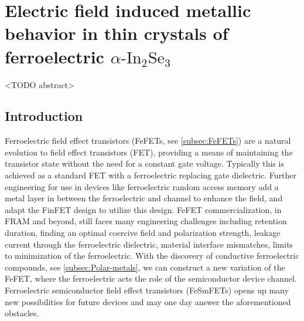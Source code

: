 
\chapter{Electric field induced metallic behavior in thin crystals of ferroelectric
$\ensuremath{\alpha}\textrm{-In}_{2}\textrm{Se}_{3}$\label{chapter:FeSm-FET}}

<TODO abstract>

\section{Introduction}

Ferroelectric field effect transistors (FeFETs, see \ref{subsec:FeFETs})
are a natural evolution to field effect transistors (FET), providing
a means of maintaining the transistor state without the need for a
constant gate voltage. Typically this is achieved as a standard FET
with a ferroelectric replacing gate dielectric.\citep{si2018ferroelectric,dunkel2017fefet}
Further engineering for use in devices like ferroelectric random access
memory add a metal layer in between the ferroelectric and channel
to enhance the field, and adapt the FinFET design to utilize this
design.\citep{khan2020future} FeFET commercialization, in FRAM and
beyond, still faces many engineering challenges including retention
duration, finding an optimal coercive field and polarization strength,
leakage current through the ferroelectric dielectric, material interface
mismatches, limits to minimization of the ferroelectric.\citep{ma2002why,khan2020future}
With the discovery of conductive ferroelectric compounds, see \ref{subsec:Polar-metals},
we can construct a new variation of the FeFET, where the ferroelectric
acts the role of the semiconductor device channel.\citep{si2018ferroelectric}
Ferroelectric semiconductor field effect transistors (FeSmFETs) opens
up many new possibilities for future devices and may one day answer
the aforementioned obstacles.

